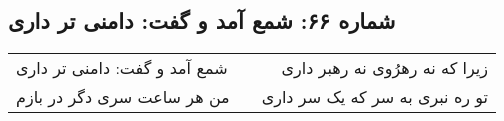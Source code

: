 \begin{center}
\section*{شماره ۶۶: شمع آمد و گفت: دامنی تر داری}
\label{sec:066}
\begin{longtable}{l p{0.5cm} r}
شمع آمد و گفت: دامنی تر داری
&&
زیرا که نه رهرُوی نه رهبر داری
\\
من هر ساعت سری دگر در بازم
&&
تو ره نبری به سر که یک سر داری
\\
\end{longtable}
\end{center}
